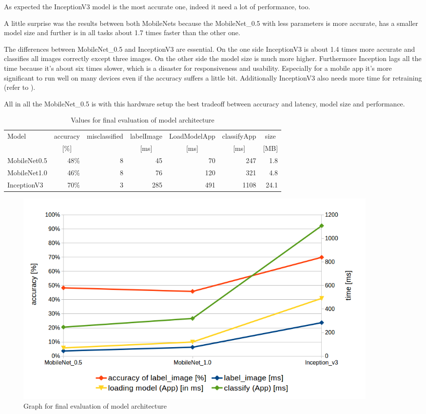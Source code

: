As expected the InceptionV3 model is the most accurate one, indeed it need a lot of performance, too. 

A little surprise was the results between both MobileNets because the MobileNet_0.5 with less parameters is more accurate, has a smaller model size and further is in all tasks about 1.7 times faster than the other one. 

The differences between MobileNet_0.5 and InceptionV3 are essential. On the one side InceptionV3 is about 1.4 times more accurate and classifies all images correctly except three images. On the other side the model size is much more higher. Furthermore Inception lags all the time because it's about six times slower, which is a disaster for responsiveness and usability. Especially for a mobile app it's more significant to run well on many devices even if the accuracy suffers a little bit. Additionally InceptionV3 also needs more time for retraining (refer to ).

All in all the MobileNet_0.5 is with this hardware setup the best tradeoff between accuracy and latency, model size and performance.


\begin{table}[]
\centering
\begin{tabular}{|l|r|r|r|r|r|r|}
\hline
Model      & \multicolumn{1}{c|}{accuracy} & \multicolumn{1}{c|}{misclassified} & \multicolumn{1}{c|}{labelImage} & \multicolumn{1}{c|}{LoadModelApp}& \multicolumn{1}{c|}{classifyApp}  & \multicolumn{1}{c|}{size}\\
      & \multicolumn{1}{c|}{[\%]} & \multicolumn{1}{l|}{} & \multicolumn{1}{c|}{[ms]} & \multicolumn{1}{c|}{[ms]}& \multicolumn{1}{c|}{[ms]} & [MB]\\ \hline
MobileNet0.5 & 48\%                          & 8                                           & 45                                & 70           & 247        & 1.8 \\ \hline
MobileNet1.0 & 46\%                          & 8                                           & 76                                & 120          & 321        & 4.8 \\ \hline
InceptionV3    & 70\%                          & 3                                           & 285                               & 491          & 1108       & 24.1 \\ \hline
\end{tabular}
\caption{Values for final evaluation of model architecture}
\label{tab:finalEval}
\end{table}


\begin{figure}[htbp]
\centering
\includegraphics[width=0.9\textwidth]{includes/evalTimesModels}
\caption{Graph for final evaluation of model architecture}
\label{fig:finalEval}
\end{figure}